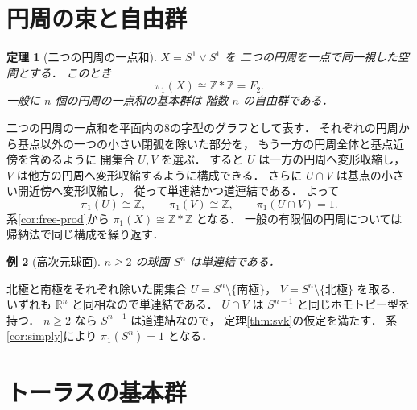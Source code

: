 \documentclass[a5paper,10pt,onecolumn]{jsarticle}
\makeatletter
\theoremstyle{mathnotetheorem}
\newtheorem{theorem}{定理}[section]
\newtheorem{example}[theorem]{例}
\renewcommand{\proofname}{証明}
\renewenvironment{proof}[1][\proofname]{%
  \par\pushQED{\qed}\normalfont\topsep4\p@\@plus2\p@\relax
  \trivlist\item[\hskip\labelsep\bfseries #1]\ignorespaces
}{\popQED\endtrivlist\@endpefalse}
\makeatother
\begin{document}
\section{円周の束と自由群}

\begin{theorem}[二つの円周の一点和]\label{thm:wedge}
$X=S^1\vee S^1$ を
二つの円周を一点で同一視した空間とする．
このとき
\[
 \pi_1(X)\cong\mathbb Z*\mathbb Z=F_2.
\]
一般に $n$ 個の円周の一点和の基本群は
階数 $n$ の自由群である．
\end{theorem}
\begin{proof}
二つの円周の一点和を平面内の8の字型のグラフとして表す．
それぞれの円周から基点以外の一つの小さい閉弧を除いた部分を，
もう一方の円周全体と基点近傍を含めるように
開集合 $U,V$ を選ぶ．
すると $U$ は一方の円周へ変形収縮し，
$V$ は他方の円周へ変形収縮するように構成できる．
さらに $U\cap V$ は基点の小さい開近傍へ変形収縮し，
従って単連結かつ道連結である．
よって
\[
 \pi_1(U)\cong\mathbb Z,\qquad
 \pi_1(V)\cong\mathbb Z,\qquad
 \pi_1(U\cap V)=1.
\]
系\ref{cor:free-prod}から
$\pi_1(X)\cong\mathbb Z*\mathbb Z$ となる．
一般の有限個の円周については帰納法で同じ構成を繰り返す．
\end{proof}

\begin{example}[高次元球面]
$n\ge2$ の球面 $S^n$ は単連結である．
\end{example}
\begin{proof}
北極と南極をそれぞれ除いた開集合
$U=S^n\setminus\{\text{南極}\}$，
$V=S^n\setminus\{\text{北極}\}$ を取る．
いずれも $\mathbb R^n$ と同相なので単連結である．
$U\cap V$ は $S^{n-1}$ と同じホモトピー型を持つ．
$n\ge2$ なら $S^{n-1}$ は道連結なので，
定理\ref{thm:svk}の仮定を満たす．
系\ref{cor:simply}により $\pi_1(S^n)=1$ となる．
\end{proof}

\section{トーラスの基本群}
\end{document}
